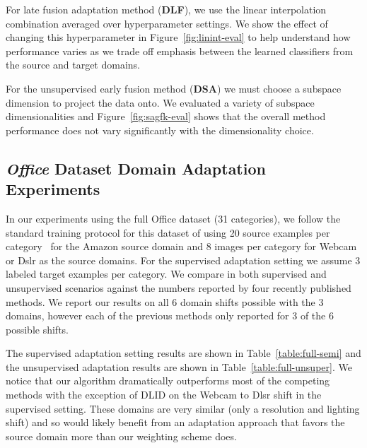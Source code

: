   For late fusion adaptation method (\textbf{DLF}), we use the linear interpolation combination averaged over hyperparameter settings. We show the effect of changing this hyperparameter in Figure~\ref{fig:linint-eval} to help understand how performance varies as we trade off emphasis between the learned classifiers from the source and target domains. 

  For the unsupervised early fusion method (\textbf{DSA}) we must choose a subspace dimension to project the data onto. We evaluated a variety of
  subspace dimensionalities and Figure~\ref{fig:sagfk-eval} shows that the overall method performance does not vary significantly with the dimensionality choice.

\subsection{\emph{Office} Dataset Domain Adaptation Experiments}
In our experiments using the full Office dataset (31 categories),
we follow the standard training protocol for this dataset of using 20 source
examples per category~\cite{saenko-eccv10,gong-cvpr12}
 for the Amazon source domain and 8 images per category for Webcam or
 Dslr as the source domains. For the supervised adaptation setting 
 we assume 3 labeled target examples per category.
We compare in both supervised and unsupervised scenarios against the numbers reported by four recently published methods.
We report our results on all 6 domain shifts possible with the 3 domains, however each of the previous methods only reported for  3 of the 6 possible shifts.

The supervised adaptation setting results are shown in Table~\ref{table:full-semi} and the unsupervised adaptation results are shown in Table~\ref{table:full-unsuper}. We notice that our algorithm dramatically outperforms most of the competing methods with the exception of DLID on the Webcam to Dlsr shift in the supervised setting. These domains are very similar (only a resolution and lighting shift) and so would likely benefit from an adaptation approach that favors the source domain more than our weighting scheme does. 

